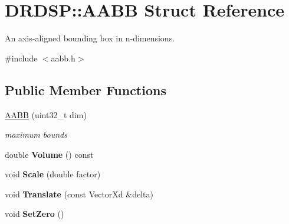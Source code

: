 \hypertarget{struct_d_r_d_s_p_1_1_a_a_b_b}{\section{D\-R\-D\-S\-P\-:\-:A\-A\-B\-B Struct Reference}
\label{struct_d_r_d_s_p_1_1_a_a_b_b}
}


An axis-\/aligned bounding box in n-\/dimensions.  




{\ttfamily \#include $<$aabb.\-h$>$}

\subsection*{Public Member Functions}
\begin{DoxyCompactItemize}
\item 
\hypertarget{struct_d_r_d_s_p_1_1_a_a_b_b_a1c7e675e120109fe01b9e25163ee1582}{\hyperlink{struct_d_r_d_s_p_1_1_a_a_b_b_a1c7e675e120109fe01b9e25163ee1582}{A\-A\-B\-B} (uint32\-\_\-t dim)}\label{struct_d_r_d_s_p_1_1_a_a_b_b_a1c7e675e120109fe01b9e25163ee1582}

\begin{DoxyCompactList}\small\item\em maximum bounds \end{DoxyCompactList}\item 
\hypertarget{struct_d_r_d_s_p_1_1_a_a_b_b_afde78b10d7572acdd515b711a11854d2}{double {\bfseries Volume} () const }\label{struct_d_r_d_s_p_1_1_a_a_b_b_afde78b10d7572acdd515b711a11854d2}

\item 
\hypertarget{struct_d_r_d_s_p_1_1_a_a_b_b_aed54140a2475ce0bb49cff8b4672a27e}{void {\bfseries Scale} (double factor)}\label{struct_d_r_d_s_p_1_1_a_a_b_b_aed54140a2475ce0bb49cff8b4672a27e}

\item 
\hypertarget{struct_d_r_d_s_p_1_1_a_a_b_b_a59540823643c20e61f49dac04a167649}{void {\bfseries Translate} (const Vector\-Xd \&delta)}\label{struct_d_r_d_s_p_1_1_a_a_b_b_a59540823643c20e61f49dac04a167649}

\item 
\hypertarget{struct_d_r_d_s_p_1_1_a_a_b_b_abee9488dff679ac9956fc01dbbe5b4ef}{void {\bfseries Set\-Zero} ()}\label{struct_d_r_d_s_p_1_1_a_a_b_b_abee9488dff679ac9956fc01dbbe5b4ef}

\end{DoxyCompactItemize}
